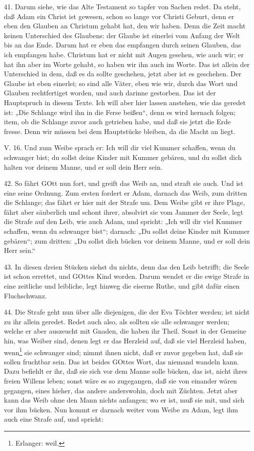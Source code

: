 41. Darum siehe, wie das Alte Testament so tapfer von Sachen redet. Da steht, daß Adam ein Christ ist gewesen, schon so lange vor Christi Geburt, denn er eben den Glauben an Christum gehabt hat, den wir haben. Denn die Zeit macht keinen Unterschied des Glaubens: der Glaube ist einerlei vom Anfang der Welt bis an das Ende. Darum hat er eben das empfangen durch seinen Glauben, das ich empfangen habe. Christum hat er nicht mit Augen gesehen, wie auch wir; er hat ihn aber im Worte gehabt, so haben wir ihn auch im Worte. Das ist allein der Unterschied in dem, daß es da sollte geschehen, jetzt aber ist es geschehen. Der Glaube ist eben einerlei; so sind alle Väter, eben wie wir, durch das Wort und Glauben rechtfertiget worden, und auch darinne gestorben. Das ist der Hauptspruch in diesem Texte. Ich will aber hier lassen anstehen, wie das geredet ist: „Die Schlange wird ihn in die Ferse beißen“, denn es wird hernach folgen; item, ob die Schlange zuvor auch getrieben habe, und daß sie jetzt die Erde fresse. Denn wir müssen bei dem Hauptstücke bleiben, da die Macht an liegt.

\begin{schriftzitat}
V. 16. Und zum Weibe sprach er: Ich will dir viel Kummer schaffen, wenn du schwanger bist; du sollst deine Kinder mit Kummer gebären, und du sollst dich halten vor deinem Manne, und er soll dein Herr sein.
\end{schriftzitat}

42. So fährt GOtt nun fort, und greift das Weib an, und straft sie auch. Und ist eine seine Ordnung. Zum ersten fordert er Adam, darnach das Weib, zum dritten die Schlange; das fährt er hier mit der Strafe um. Dem Weibe gibt er ihre Plage, fährt aber säuberlich und schont ihrer, absolvirt sie vom Jammer der Seele, legt die Strafe auf den Leib, wie auch Adam,
und spricht: „Ich will dir viel Kummer schaffen, wenn du schwanger bist“; darnach: „Du sollst deine Kinder mit Kummer gebären“; zum dritten: „Du sollst dich bücken vor deinem Manne, und er soll dein Herr sein.“

43. In diesen dreien Stücken siehst du nichts, denn das den Leib betrifft; die Seele ist schon errettet, und GOttes Kind worden. Darum wendet er die ewige Strafe in eine zeitliche und leibliche, legt hinweg die eiserne Ruthe, und gibt dafür einen Fluchschwanz.

44. Die Strafe geht nun über alle diejenigen, die der Eva Töchter werden; ist nicht zu ihr allein geredet. Redet auch also, als sollten sie alle schwanger werden; welche er aber auszeucht mit Gnaden, die haben ihr Theil. Sonst in der Gemeine hin, was Weiber sind, denen legt er das Herzleid auf, daß sie viel Herzleid haben, wenn\footnote{Erlanger: weil.} sie schwanger sind; nimmt ihnen nicht, daß er zuvor gegeben hat, daß sie sollen fruchtbar sein. Das ist beides GOttes Wort, das niemand wandeln kann. Dazu befiehlt er ihr, daß sie sich vor dem Manne solle bücken, das ist, nicht ihres freien Willens leben; sonst wäre es so zugegangen, daß sie von einander wären gegangen, eines hieher, das andere anderswohin, doch mit Züchten. Jetzt aber kann das Weib ohne den Mann nichts anfangen; wo er ist, muß sie mit, und sich vor ihm bücken. Nun kommt er darnach weiter vom Weibe zu Adam, legt ihm auch eine Strafe auf, und spricht:

